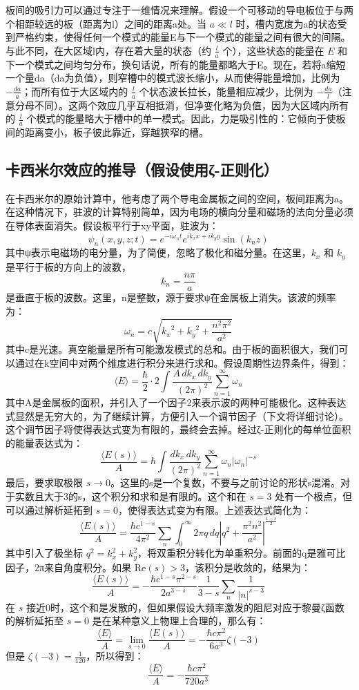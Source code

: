 板间的吸引力可以通过专注于一维情况来理解。假设一个可移动的导电板位于与两个相距较远的板（距离为l）之间的距离a处。当 \( a \ll l \) 时，槽内宽度为a的状态受到严格约束，使得任何一个模式的能量E与下一个模式的能量之间有很大的间隔。与此不同，在大区域l内，存在着大量的状态（约 \( \frac{l}{a} \) 个），这些状态的能量在 \( E \) 和下一个模式之间均匀分布，换句话说，所有的能量都略大于E。现在，若将a缩短一个量da（da为负值），则窄槽中的模式波长缩小，从而使得能量增加，比例为 \( -\frac{da}{a} \)；而所有位于大区域内的 \( \frac{l}{a} \) 个状态波长拉长，能量相应减少，比例为 \( -\frac{da}{l} \)（注意分母不同）。这两个效应几乎互相抵消，但净变化略为负值，因为大区域内所有的 \( \frac{l}{a} \) 个模式的能量略大于槽中的单一模式。因此，力是吸引性的：它倾向于使板间的距离变小，板子彼此靠近，穿越狭窄的槽。
\subsection{卡西米尔效应的推导（假设使用ζ-正则化）}
在卡西米尔的原始计算中，他考虑了两个导电金属板之间的空间，板间距离为a。在这种情况下，驻波的计算特别简单，因为电场的横向分量和磁场的法向分量必须在导体表面消失。假设板平行于xy平面，驻波为：
\[
\psi_n(x, y, z; t) = e^{-i\omega_n t} e^{i k_x x + i k_y y} \sin(k_n z)~
\]
其中ψ表示电磁场的电分量，为了简便，忽略了极化和磁分量。在这里，\( k_x \) 和 \( k_y \) 是平行于板的方向上的波数，
\[
k_n = \frac{n\pi}{a}~
\]
是垂直于板的波数。这里，n是整数，源于要求ψ在金属板上消失。该波的频率为：
\[
\omega_n = c \sqrt{{k_x}^2 + {k_y}^2 + \frac{n^2 \pi^2}{a^2}}~
\]
其中c是光速。真空能量是所有可能激发模式的总和。由于板的面积很大，我们可以通过在k空间中对两个维度进行积分来进行求和。假设周期性边界条件，得到：
\[
\langle E \rangle = \frac{\hbar}{2} \cdot 2 \int \frac{A \, dk_x \, dk_y}{(2\pi)^2} \sum_{n=1}^{\infty} \omega_n~
\]
其中A是金属板的面积，并引入了一个因子2来表示波的两种可能极化。这种表达式显然是无穷大的，为了继续计算，方便引入一个调节因子（下文将详细讨论）。这个调节因子将使得表达式变为有限的，最终会去掉。经过ζ-正则化的每单位面积的能量表达式为：
\[
\frac{\langle E(s)\rangle}{A} = \hbar \int \frac{dk_x \, dk_y}{(2\pi)^2} \sum_{n=1}^{\infty} \omega_n \left|\omega_n\right|^{-s}~
\]
最后，要求取极限 \(s \to 0\)。这里的s是一个复数，不要与之前讨论的形状s混淆。对于实数且大于3的s，这个积分和求和是有限的。这个和在 \(s = 3\) 处有一个极点，但可以通过解析延拓到 \(s = 0\)，使得表达式变为有限。上述表达式简化为：
\[
\frac{\langle E(s)\rangle}{A} = \frac{\hbar c^{1-s}}{4\pi^2} \sum_{n} \int_0^\infty 2\pi q \, dq \left| q^2 + \frac{\pi^2 n^2}{a^2} \right|^{\frac{1-s}{2}}~
\]
其中引入了极坐标 \(q^2 = k_x^2 + k_y^2\)，将双重积分转化为单重积分。前面的q是雅可比因子，2π来自角度积分。如果 \(\text{Re}(s) > 3\)，该积分是收敛的，结果为：
\[
\frac{\langle E(s)\rangle}{A} = - \frac{\hbar c^{1-s} \pi^{2-s}}{2a^{3-s}} \frac{1}{3-s} \sum_{n} \frac{1}{|n|^{s-3}}~
\]
在 \(s\) 接近0时，这个和是发散的，但如果假设大频率激发的阻尼对应于黎曼ζ函数的解析延拓至 \(s = 0\) 是在某种意义上物理上合理的，那么有：
\[
\frac{\langle E\rangle}{A} = \lim_{s \to 0} \frac{\langle E(s)\rangle}{A} = -\frac{\hbar c \pi^2}{6a^3} \zeta(-3)~
\]
但是 \(\zeta(-3) = \frac{1}{120}\)，所以得到：
\[
\frac{\langle E\rangle}{A} = -\frac{\hbar c \pi^2}{720 a^3}~
\]